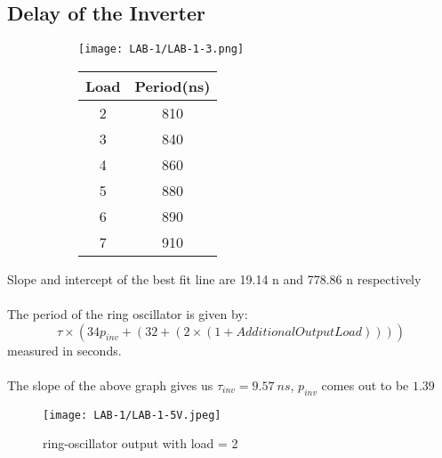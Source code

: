 \documentclass[12pt]{article}
\begin{document}
\subsection{Delay of the Inverter}
\vspace{4mm}
  \begin{figure}[H]
    \begin{subfigure}{0.7\linewidth}
      \centering
      \texttt{[image: LAB-1/LAB-1-3.png]}
    \end{subfigure} 
    \begin{subfigure}{0.2\linewidth}
      \centering
      \begin{tabular}{|c|c|}
       \hline
       \bfseries Load	& \bfseries	Period(ns)	\\
       \hline
            2 &	810\\
            3 &	840\\
            4 &	860\\
            5 &	880\\
            6 &	890\\
            7 &	910\\
           \hline
      \end{tabular}
    \end{subfigure} 
   \end{figure}
   Slope and intercept of the best fit line are 19.14 n and 778.86 n respectively \\
   \\ 
    The period of the ring oscillator is given by:
    \vspace{4mm}
\begin{equation}
\tau \times (34p_{inv} + (32 + (2 \times (1 + AdditionalOutputLoad))))
\end{equation}
   measured in seconds.
\\
\\
    \vspace{1cm}
The slope of the above graph gives us $\tau_{inv} = 9.57 \ ns$, $p_{inv}$ comes out to be $1.39$
\begin{figure}[H]
    \centering
    \texttt{[image: LAB-1/LAB-1-5V.jpeg]}
    \caption{ring-oscillator output with load = 2}
\end{figure}
\end{document}
